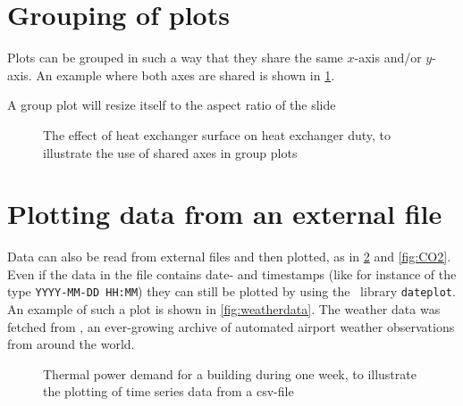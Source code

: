 \section{Grouping of plots}
Plots can be grouped in such a way that they share the same $x$-axis and/or $y$-axis. An example where both axes are shared is shown in \cref{fig:groupplot}.

\begin{frame}{A group plot will resize itself to the aspect ratio of the slide}
	\begin{figure}\centering
		\caption{The effect of heat exchanger surface on heat exchanger duty, to illustrate the use of shared axes in group plots}\label{fig:groupplot}
	\end{figure}
\end{frame}

\section{Plotting data from an external file}
Data can also be read from external files and then plotted, as in \cref{fig:thermalpower} and \cref{fig:CO2}. Even if the data in the file contains date- and timestamps (like for instance of the type \texttt{YYYY-MM-DD HH:MM}) they can still be plotted by using the \TikZ\ library \texttt{dateplot}. An example of such a plot is shown in \cref{fig:weatherdata}. The weather data was fetched from \cite{mesonet}, an ever-growing archive of automated airport weather observations from around the world.

\begin{figure}\centering
    \caption{Thermal power demand for a building during one week, to illustrate the plotting of time series data from a csv-file}\label{fig:thermalpower}
\end{figure}


